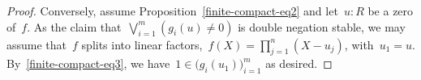 \begin{proof}
Conversely, assume Proposition~\eqref{finite-compact-eq2} and let~$u : R$ be a
zero of~$f$. As the claim that~$\bigvee_{i=1}^m (g_i(u) \neq 0)$ is double
negation stable, we may assume that~$f$ splits into linear factors,~$f(X) =
\prod_{j=1}^n (X-u_j)$, with~$u_1 = u$. By~\eqref{finite-compact-eq3}, we
have~$1 \in \bigl(g_i(u_1)\bigr)_{i=1}^m$ as desired.
\end{proof}
